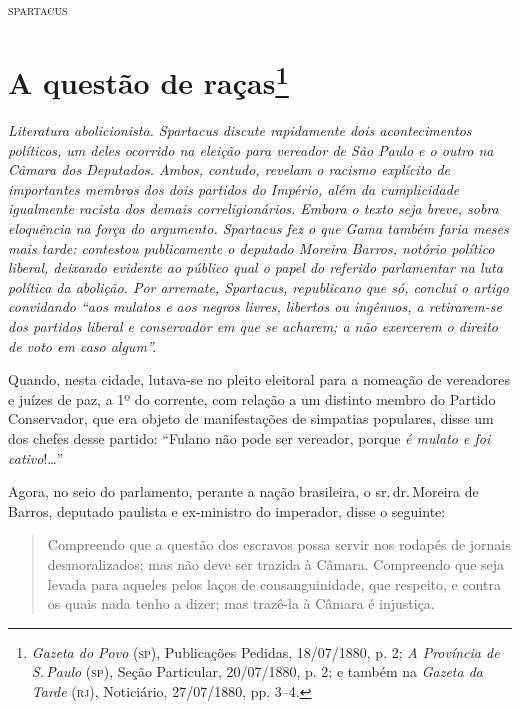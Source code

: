 \medskip{}
\hfill\textsc{spartacus}

\chapter{A questão de raças\footnote{\emph{Gazeta do Povo}
  (\textsc{sp}), Publicações Pedidas, 18/07/1880, p. 2; \emph{A Província de S.\,Paulo} (\textsc{sp}), Seção Particular, 20/07/1880, p. 2; e também na
  \emph{Gazeta da Tarde} (\textsc{rj}), Noticiário, 27/07/1880, pp. 3--4.}}

\begin{resumo}
\emph{Literatura abolicionista. Spartacus discute rapidamente
dois acontecimentos políticos, um deles ocorrido na eleição para
vereador de São Paulo e o outro na Câmara dos Deputados. Ambos, contudo,
revelam o racismo explícito de importantes membros dos dois partidos do
Império, além da cumplicidade igualmente racista dos demais
correligionários. Embora o texto seja breve, sobra eloquência na força
do argumento. Spartacus fez o que Gama também faria meses mais
tarde: contestou publicamente o deputado Moreira Barros, notório
político liberal, deixando evidente ao público qual o papel do referido
parlamentar na luta política da abolição. Por arremate,
Spartacus, republicano que só, conclui o artigo convidando ``aos
mulatos e aos negros livres, libertos ou ingênuos, a retirarem-se dos
partidos liberal e conservador em que se acharem; a não exercerem o
direito de voto em caso algum''.}
\end{resumo}


Quando, nesta cidade, lutava-se no pleito eleitoral para a nomeação de
vereadores e juízes de paz, a 1º do corrente, com relação a um distinto
membro do Partido Conservador, que era objeto de manifestações de
simpatias populares, disse um dos chefes desse partido: ``Fulano não pode
ser vereador, porque \emph{é mulato e foi cativo}!\ldots{}''

Agora, no seio do parlamento, perante a nação brasileira, o sr.\,dr.\,Moreira de Barros, deputado paulista e ex-ministro do imperador, disse o seguinte:

\begin{quote}
Compreendo que a questão dos escravos possa servir nos rodapés de
jornais desmoralizados; mas não deve ser trazida à Câmara. Compreendo
que seja levada para aqueles pelos laços de consanguinidade, que
respeito, e contra os quais nada tenho a dizer; mas trazê-la à Câmara é
injustiça.
\end{quote}

